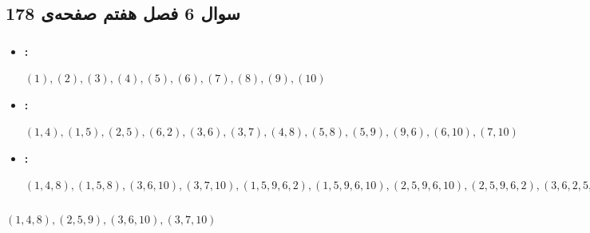 \documentclass{article}
\begin{document}


\newpage

\section{}%
\subsection{سوال 6 فصل هفتم صفحه‌ی 178}
\subsubsection{}
\begin{itemize}
\item \textbf{: }
\begin{latin}
$
(1), (2), (3), (4), (5), (6), (7), (8), (9), (10)
$
\end{latin}

\item \textbf{: }
\begin{latin}
$
(1, 4), (1, 5), (2, 5), (6, 2), (3, 6), (3, 7), (4, 8), (5, 8), (5, 9), (9, 6), (6, 10), (7, 10)
$
\end{latin}

\item \textbf{: }
\begin{latin}
\resizebox{.99\hsize}{!}
{$
(1,4,8), (1,5,8), (3,6,10), (3,7,10), (1,5,9,6,2), (1,5,9,6,10), (2,5,9,6,10),
(2,5,9,6,2), (3,6,2,5,8), (3,6,2,5,9), (5,9,6,2,5), (6,2,5,9,6), (9,6,2,5,8), (9,6,2,5,9)
$}
\end{latin}

\end{itemize}


\subsubsection{}
\begin{latin}
$
(1, 4, 8), (2, 5, 9), (3, 6, 10), (3, 7, 10)
$
\end{latin}
\end{document}
